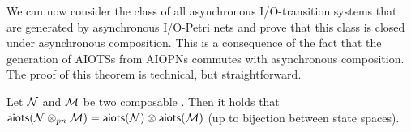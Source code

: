 We can now consider the class of all asynchronous I/O-transition systems that are generated by asynchronous I/O-Petri nets
and prove that this class is closed under asynchronous composition. This is a consequence of the fact that the generation of
AIOTSs from AIOPNs commutes with asynchronous composition. The proof of this theorem is technical, but straightforward.



\begin{theorem}\label{thm:comp-semantics}
  Let $\mathcal{N}$ and $\mathcal{M}$ be two composable \AIOPNs. Then it holds that
$\mathsf{aiots}(\mathcal{N} \otimes_{pn} \mathcal{M}) = \mathsf{aiots}(\mathcal{N}) \otimes \mathsf{aiots}(\mathcal{M})$ (up to bijection between state spaces).
\end{theorem}
